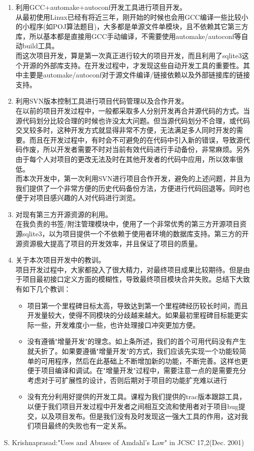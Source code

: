 \documentclass[a4paper,12pt]{article}
\begin{document}
\begin{CJK*}{UTF8}{song}
	\begin{enumerate}
		\item{利用GCC+automake+autoconf开发工具进行项目开发。\\
			从最初使用Linux已经有将近三年，刚开始的时候也会用GCC编译一些比较小的小程序(如POJ算法题目)，大多都是单源文件单模块，且不依赖其它第三方库，所以基本都是直接用GCC手动编译，不需要使用automake/autoconf等自动build工具。\\
			而这次项目开发，算是第一次真正进行较大的项目开发，而且利用了sqlite3这个开源的外部库支持。在开发过程中，才发现这些自动开发工具的重要性。其中主要是automake/autoconf对于源文件编译/链接依赖以及外部链接库的链接支持。}
		\item{利用SVN版本控制工具进行项目代码管理以及合作开发。\\
			在以前的项目开发过程中，一般都采取多人分别开发再合并源代码的方式。当源代码划分比较合理的时候也许没太大问题。但当源代码划分不合理，或代码交叉较多时，这种开发方式就显得非常不方便，无法满足多人同时开发的需要。而且在开发过程中，有时会不可避免的在代码中引入新的错误，导致源代码作废，所以开发者需要不时对当前有效代码进行手动备份，非常麻烦。另外由于每个人对项目的更改无法及时在其他开发者的代码中应用，所以效率很低。\\
			而本次开发中，第一次利用SVN进行项目合作开发，避免的上述问题，并且为我们提供了一个非常方便的历史代码备份方法，方便进行代码回退等。同时也便于对项目感兴趣的人对代码进行浏览。}
		\item{对现有第三方开源资源的利用。\\
			在我负责的书签/附注管理模块中，使用了一个非常优秀的第三方开源项目资源sqlite3，以为项目提供一个不依赖于使用者环境的数据库支持。第三方的开源资源极大提高了项目的开发效率，并且保证了项目的质量。}
		\item{关于本次项目开发中的教训。\\
			项目开发过程中，大家都投入了很大精力，对最终项目成果比较期待。但是由于项目最初接口定义方面的模糊性，导致最终项目模块合并失败。总结下大致有如下几个教训：
			\begin{itemize}
				\item{项目第一个里程碑目标太高，导致达到第一个里程碑经历较长时间，而且开发量较大，使得不同模块的分歧越来越大。如果最初里程碑目标能更实际一些，开发难度小一些，也许处理接口冲突更加方便。}
				\item{没有遵循"增量开发"的理念。如上条所述，我们的首个可用代码没有产生就夭折了。如果要遵循"增量开发"的方式，我们应该先实现一个功能较简单的可用程序，然后在此基础上不断增加新的功能，不断完善。这样也更便于项目编译和调试。在"增量开发"过程中，需要注意一点的是需要充分考虑对于可扩展性的设计，否则后期对于项目的功能扩充难以进行}
				\item{没有充分利用好提供的开发工具。课程为我们提供的trac版本跟踪工具，以便于我们项目开发过程中开发者之间相互交流和使用者对于项目bug提交，以及项目发布。但是我们没有及时发现这一强大工具的作用，这对我们项目最终的失败也有一定关系。}
			\end{itemize}
			}
	\end{enumerate}

	\begin{thebibliography}{99}

			S. Krishnaprasad:"Uses and Abuses of Amdahl's Law" in JCSC 17,2(Dec. 2001)
	\end{thebibliography}

\end{CJK*}
\end{document}
